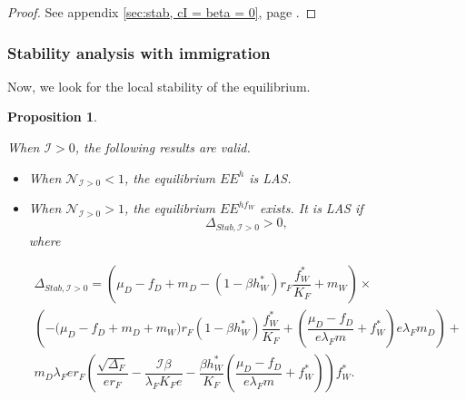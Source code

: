 \documentclass{article}
\newcommand{\lfw}{\lambda_{F}}
\newcommand{\lfw}{\lambda_{F}}
\newcommand{\cI}{\mathcal{I}}
\newtheorem{prop}[theorem]{Proposition}
\theoremstyle{definition}
\theoremstyle{remark}
\begin{document}
\begin{proof}
See appendix \ref{sec:stab, cI = beta = 0}, page \pageref{sec:stab, cI = beta = 0}.
\end{proof}


\subsubsection{Stability analysis with immigration}
Now, we look for the local stability of the equilibrium.
\begin{prop}\label{prop:stab, cI>0} 

When $\cI > 0$, the following results are valid.
\begin{itemize}
\item When $\mathcal{N}_{\cI > 0} < 1$, the equilibrium $EE^{h}$ is LAS.
\item When $\mathcal{N}_{\cI > 0} > 1$, the equilibrium $EE^{hf_W}$  exists. It is LAS if 
$$\Delta_{Stab, \cI > 0} > 0,$$  where 

\begin{multline}
\Delta_{Stab, \cI > 0} = \left(\mu_D -f_D + m_D - (1 - \beta h_W^*)r_F \dfrac{f_W^*}{K_F} + m_W  \right) \times \\ \left(- \big( \mu_D  -f_D + m_D + m_W) r_F(1 - \beta h_W^*) \dfrac{f^*_W}{K_F} + \left(\dfrac{\mu_D -f_D}{e\lfw m} + f_W^*\right) e \lfw m_D \right) + \\
m_D \lfw e r_F \left(\dfrac{\sqrt{\Delta_F}}{er_F} - \dfrac{\cI \beta}{\lfw K_F e} - \dfrac{\beta h_W^*}{K_F} \left(\dfrac{\mu_D -f_D }{e \lfw m} + f_W^*\right)\right)  f^*_{W}.
\label{eq:deltaStab, I>0}
\end{multline}
\end{itemize}
\end{prop}
\end{document}
